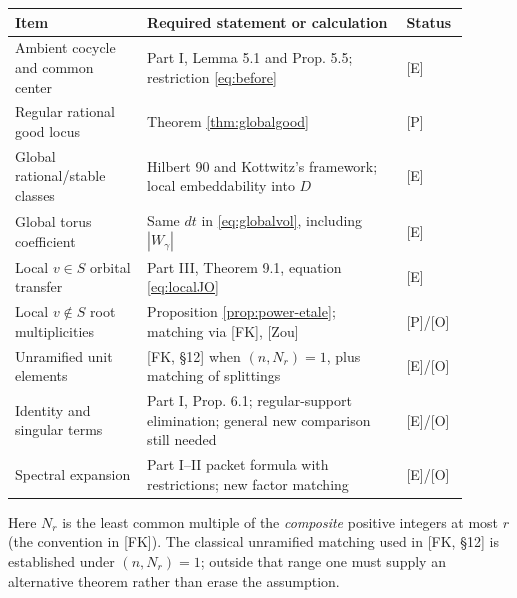 \documentclass[11pt]{article}
\theoremstyle{plain}
\theoremstyle{definition}
\begin{document}
\begin{center}\small
\begin{longtable}{@{}p{0.27\linewidth}p{0.53\linewidth}p{0.10\linewidth}@{}}
\toprule
Item & Required statement or calculation & Status\\\midrule
\endhead
Ambient cocycle and common center & Part I, Lemma 5.1 and Prop. 5.5; restriction \eqref{eq:before} & [E]\\
Regular rational good locus & Theorem \ref{thm:globalgood} & [P]\\
Global rational/stable classes & Hilbert 90 and Kottwitz's framework; local embeddability into $D$ & [E]\\
Global torus coefficient & Same $dt$ in \eqref{eq:globalvol}, including $|W_\gamma|$ & [E]\\
Local $v\in S$ orbital transfer & Part III, Theorem 9.1, equation \eqref{eq:localJO} & [E]\\
Local $v\notin S$ root multiplicities & Proposition \ref{prop:power-etale}; matching via [FK], [Zou] & [P]/[O]\\
Unramified unit elements & [FK, \S12] when $(n,N_r)=1$, plus matching of splittings & [E]/[O]\\
Identity and singular terms & Part I, Prop. 6.1; regular-support elimination; general new comparison still needed & [E]/[O]\\
Spectral expansion & Part I--II packet formula with restrictions; new factor matching & [E]/[O]\\
\bottomrule
\end{longtable}
\end{center}
Here $N_r$ is the least common multiple of the \emph{composite}
positive integers at most $r$ (the convention in [FK]).  The
classical unramified matching used in [FK, \S12] is established
under $(n,N_r)=1$; outside that range one must supply an alternative
theorem rather than erase the assumption.
\end{document}
